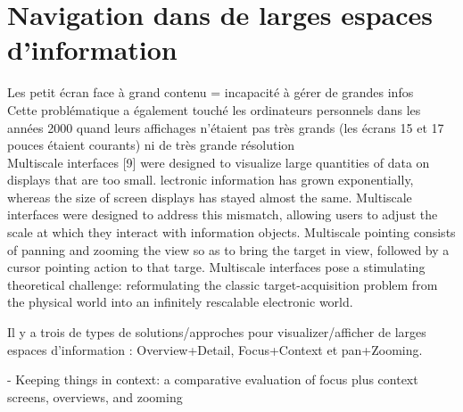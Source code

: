 

\section{Navigation dans de larges espaces d'information}
Les 
petit écran face à grand contenu = incapacité à gérer de grandes infos\\
Cette problématique a également touché les ordinateurs personnels dans les années 2000 quand leurs affichages n'étaient pas très grands (les écrans 15 et 17 pouces étaient courants) ni de très grande résolution\\

\cite{Guiard2004}
Multiscale interfaces [9] were designed to visualize large quantities of data on displays that are too small.
lectronic information has grown exponentially, whereas the size of screen displays has stayed almost the same. Multiscale interfaces were designed to address this mismatch, allowing users to adjust the scale at which they interact with information objects.
Multiscale pointing consists of panning and zooming the view so as to bring the target in view, followed by a cursor pointing action to that targe. Multiscale interfaces pose a stimulating theoretical challenge: reformulating the classic target-acquisition problem from the physical world into an infinitely rescalable electronic world.

Il y a trois de types de solutions/approches pour visualizer/afficher de larges espaces d'information : Overview+Detail, Focus+Context et pan+Zooming.


\cite{Baudisch2002} - Keeping things in context: a comparative evaluation of focus plus context screens, overviews, and zooming


